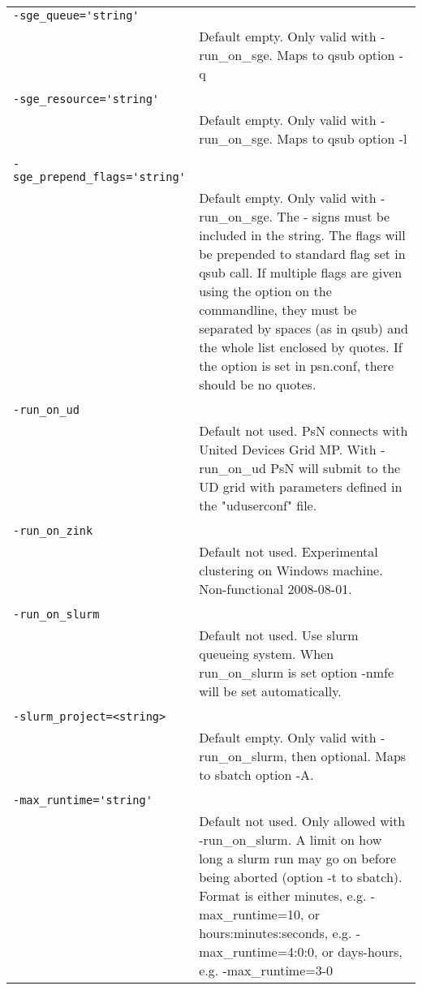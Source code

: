 \documentclass[a4paper,12pt]{article}
\begin{document}
\begin{longtable}{p{1in}p{4in}}
\\
\verb|-sge_queue='string'| & \\
\nopagebreak
 & Default empty. Only valid with -run\_on\_sge. Maps to qsub option -q \\
\\
\verb|-sge_resource='string'| & \\
\nopagebreak
 & Default empty. Only valid with -run\_on\_sge. Maps to qsub option -l \\
\\
\verb|-sge_prepend_flags='string'| & \\
\nopagebreak
 & Default empty. Only valid with -run\_on\_sge. The - signs must be included in the string. The flags will be prepended to standard flag set in qsub call. If multiple flags are given using the option on the commandline, they must be separated by spaces (as in qsub) and the whole list enclosed by quotes. If the option is set in psn.conf, there should be no quotes. \\
\\
\verb|-run_on_ud| & \\
\nopagebreak
 & Default not used. PsN connects with United Devices Grid MP. With -run\_on\_ud PsN will submit to the UD grid with parameters defined in the "uduserconf" file. \\
\\
\verb|-run_on_zink| & \\
\nopagebreak
 & Default not used. Experimental clustering on Windows machine. Non-functional 2008-08-01. \\
\\
\verb|-run_on_slurm| & \\
\nopagebreak
 & Default not used. Use slurm queueing system. When run\_on\_slurm is set option -nmfe will be set automatically. \\
\\
\verb|-slurm_project=<string>| & \\
\nopagebreak
 & Default empty. Only valid with -run\_on\_slurm, then optional. Maps to sbatch option -A. \\
\\
\verb|-max_runtime='string'| & \\
\nopagebreak
 & Default not used. Only allowed with -run\_on\_slurm. A limit on how long a slurm run may go on before being aborted (option -t to sbatch). Format is either minutes, e.g. -max\_runtime=10, or hours:minutes:seconds, e.g. -max\_runtime=4:0:0, or days-hours, e.g. -max\_runtime=3-0 \\

\end{longtable}
\end{document}
